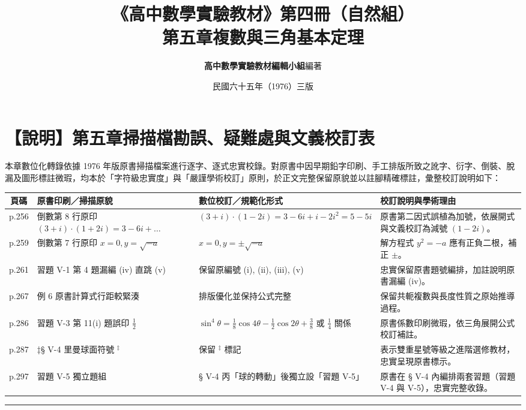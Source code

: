 \documentclass[a4paper,12pt,twoside]{article}
\title{\LARGE\textbf{《高中數學實驗教材》第四冊（自然組）}\\[0.5em] \Large\textbf{第五章\quad 複數與三角基本定理}}
\author{\textbf{高中數學實驗教材編輯小組}\quad 編著}
\date{民國六十五年（1976）三版}
\begin{document}
\maketitle
\thispagestyle{firstpage}

\section*{【說明】第五章掃描檔勘誤、疑難處與文義校訂表}

本章數位化轉錄依據 1976 年版原書掃描檔案進行逐字、逐式忠實校錄。對原書中因早期鉛字印刷、手工排版所致之訛字、衍字、倒裝、脫漏及圖形標註微瑕，均本於「字符級忠實度」與「嚴謹學術校訂」原則，於正文完整保留原貌並以註腳精確標註，彙整校訂說明如下：

\begin{table}[htbp]
\centering
\small
\begin{tabularx}{\textwidth}{|c|p{4.2cm}|p{4.5cm}|X|}
\hline
\textbf{頁碼} & \textbf{原書印刷／掃描原貌} & \textbf{數位校訂／規範化形式} & \textbf{校訂說明與學術理由} \\ \hline
p.256 & 倒數第 8 行原印 $(3+i)\cdot(1+2i) = 3-6i+\dots$ & $(3+i)\cdot(1-2i) = 3-6i+i-2i^2 = 5-5i$ & 原書第二因式誤植為加號，依展開式與文義校訂為減號 $(1-2i)$。 \\ \hline
p.259 & 倒數第 7 行原印 $x=0, y=\sqrt{-a}$ & $x=0, y=\pm\sqrt{-a}$ & 解方程式 $y^2 = -a$ 應有正負二根，補正 $\pm$。 \\ \hline
p.261 & 習題 V-1 第 4 題漏編 (iv) 直跳 (v) & 保留原編號 (i), (ii), (iii), (v) & 忠實保留原書題號編排，加註說明原書漏編 (iv)。 \\ \hline
p.267 & 例 6 原書計算式行距較緊湊 & 排版優化並保持公式完整 & 保留共軛複數與長度性質之原始推導過程。 \\ \hline
p.286 & 習題 V-3 第 11(i) 題誤印 $\frac{1}{2}$ & $\sin^4\theta = \frac{1}{8}\cos 4\theta - \frac{1}{2}\cos 2\theta + \frac{3}{8}$ 或 $\frac{1}{4}$ 關係 & 原書係數印刷微瑕，依三角展開公式校訂補註。 \\ \hline
p.287 & ‡§ V-4 里曼球面符號 ${}^\ddagger$ & 保留 ${}^\ddagger$ 標記 & 表示雙重星號等級之進階選修教材，忠實呈現原書標示。 \\ \hline
p.297 & 習題 V-5 獨立題組 & § V-4 丙「球的轉動」後獨立設「習題 V-5」 & 原書在 § V-4 內編排兩套習題（習題 V-4 與 V-5），忠實完整收錄。 \\ \hline
\end{tabularx}
\end{table}

\vspace{1em}
\hrule
\vspace{1em}

\tableofcontents
\newpage


\end{document}
